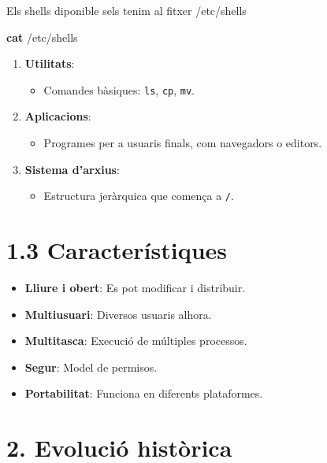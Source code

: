 \documentclass[
  a4paper,
]{article}
\newenvironment{Shaded}{\begin{snugshade}}{\end{snugshade}}
\newcommand{\FunctionTok}[1]{\textcolor[rgb]{0.13,0.29,0.53}{\textbf{#1}}}
\newcommand{\NormalTok}[1]{#1}
\providecommand{\tightlist}{%
  \setlength{\itemsep}{0pt}\setlength{\parskip}{0pt}}
\begin{document}
Els shells diponible sels tenim al fitxer /etc/shells

\begin{Shaded}
\begin{Highlighting}[]
\FunctionTok{cat}\NormalTok{ /etc/shells}
\end{Highlighting}
\end{Shaded}

\begin{enumerate}
\def\labelenumi{\arabic{enumi}.}
\setcounter{enumi}{2}
\tightlist
\item
  \textbf{Utilitats}:

  \begin{itemize}
  \tightlist
  \item
    Comandes bàsiques: \texttt{ls}, \texttt{cp}, \texttt{mv}.
  \end{itemize}
\item
  \textbf{Aplicacions}:

  \begin{itemize}
  \tightlist
  \item
    Programes per a usuaris finals, com navegadors o editors.
  \end{itemize}
\item
  \textbf{Sistema d'arxius}:

  \begin{itemize}
  \tightlist
  \item
    Estructura jeràrquica que comença a \texttt{/}.
  \end{itemize}
\end{enumerate}

\section{1.3 Característiques}\label{caracteruxedstiques}

\begin{itemize}
\tightlist
\item
  \textbf{Lliure i obert}: Es pot modificar i distribuir.
\item
  \textbf{Multiusuari}: Diversos usuaris alhora.
\item
  \textbf{Multitasca}: Execució de múltiples processos.
\item
  \textbf{Segur}: Model de permisos.
\item
  \textbf{Portabilitat}: Funciona en diferents plataformes.
\end{itemize}

\section{2. Evolució històrica}\label{evoluciuxf3-histuxf2rica}
\end{document}
